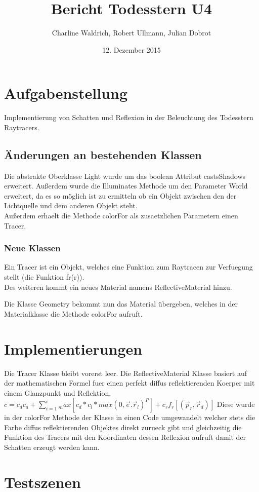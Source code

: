 \documentclass[14pt]{extarticle}
\title{Bericht Todesstern U4}
\author{Charline Waldrich, Robert Ullmann, Julian Dobrot}
\date{12. Dezember 2015}
\begin{document}
\maketitle
\pagebreak
\tableofcontents


\section{Aufgabenstellung}
Implementierung von Schatten und Reflexion in der Beleuchtung des Todesstern Raytracers.
\subsection{Änderungen an bestehenden Klassen}
Die abstrakte Oberklasse Light wurde um das boolean Attribut castsShadows erweitert. Außerdem wurde die Illuminates Methode um den Parameter World erweitert, da es so möglich ist zu ermitteln ob ein Objekt zwischen den der Lichtquelle und dem anderen Objekt steht. \\
Außerdem erhaelt die Methode colorFor als zusaetzlichen Parametern einen Tracer. 
\subsubsection{Neue Klassen}
Ein Tracer ist ein Objekt, welches eine Funktion zum Raytracen zur Verfuegung stellt (die Funktion fr(r)). \\
Des weiteren kommt ein neues Material namens ReflectiveMaterial hinzu.

Die Klasse Geometry bekommt nun das Material übergeben, welches in der Materialklasse die Methode colorFor aufruft. 

\section{Implementierungen}
Die Tracer Klasse bleibt vorerst leer. 
Die ReflectiveMaterial Klasse basiert auf der mathematischen Formel fuer einen perfekt diffus reflektierenden Koerper mit einem Glanzpunkt und Reflektion.
$
c = c_d c_a + \sum_{i=1}^i_max [ c_d * c_l * max(0, \vec e . \vec r_l )^P ] + c_r f_r [ ( \vec p_r , \vec r_d ) ] 
$
Diese wurde in der colorFor Methode der Klasse in einen Code umgewandelt welcher stets die Farbe diffus reflektierenden Objektes direkt zurueck gibt und gleichzeitig die Funktion des Tracers mit den Koordinaten dessen Reflexion aufruft damit der Schatten erzeugt werden kann.

\section{Testszenen}
\end{document}
